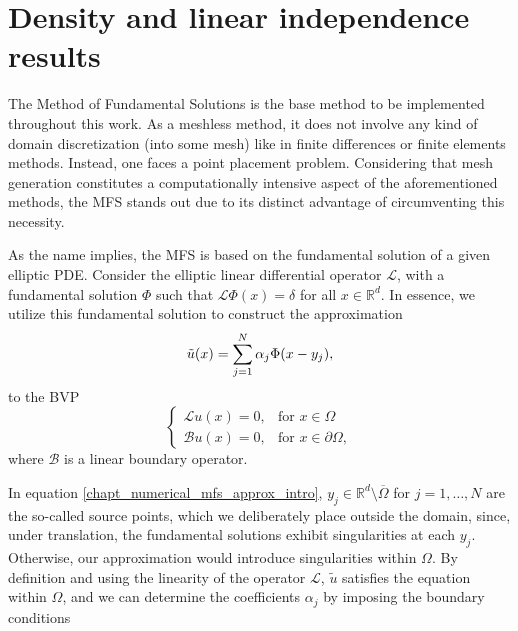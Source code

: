 \label{chap:numerical}

\section{Density and linear independence results}\label{density_proofs_section}

The Method of Fundamental Solutions is the base method to be implemented throughout this work. As a meshless method, it does not involve any kind of domain discretization (into some mesh) like in finite differences or finite elements methods. Instead, one faces a point placement problem. Considering that mesh generation constitutes a computationally intensive aspect of the aforementioned methods, the \ac{MFS} stands out due to its distinct advantage of circumventing this necessity. 

As the name implies, the \ac{MFS} is based on the fundamental solution of a given elliptic \ac{PDE}. Consider the elliptic linear differential operator $\mathcal{L}$, with a fundamental solution $\Phi$ such that $\mathcal{L}\Phi(x) = \delta$ for all $x \in \mathbb{R}^d$. In essence, we utilize this fundamental solution to construct the approximation
\begin{equation}\label{chapt_numerical_mfs_approx_intro}
\Tilde{u}(x) = \sum_{j=1}^{N}\alpha_j \Phi(x-y_j),
\end{equation}
to the \ac{BVP}
\[
\begin{cases}
    \mathcal{L}u(x) = 0, & \text{for } x \in \Omega\\
    \mathcal{B}u(x) = 0, & \text{for } x \in \partial\Omega,
\end{cases}
\]
where $\mathcal{B}$ is a linear boundary operator.

In equation \eqref{chapt_numerical_mfs_approx_intro}, $y_j \in \mathbb{R}^d\setminus \overline{\Omega}$ for $j=1,\dots, N$ are the so-called source points, which we deliberately place outside the domain, since, under translation, the fundamental solutions exhibit singularities at each $y_j$. Otherwise, our approximation would introduce singularities within $\Omega$. By definition and using the linearity of the operator $\mathcal{L}$, $\tilde{u}$ satisfies the equation within $\Omega$, and we can determine the coefficients $\alpha_j$ by imposing the boundary conditions

